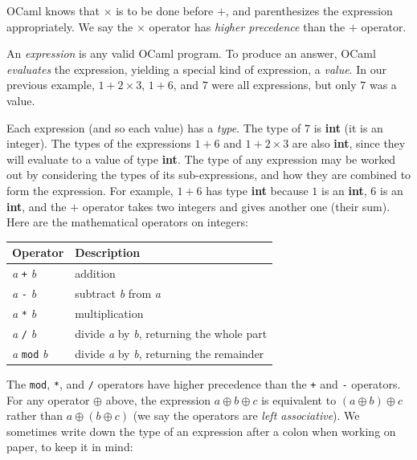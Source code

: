 \documentclass[]{book}
\newcommand{\smspace}{\vspace{4mm}}
\begin{document}
\noindent OCaml knows that $\times$ is to be done before $+$, and parenthesizes the expression appropriately. We say the $\times$ operator has \textit{higher precedence} than the $+$ operator.

An \textit{expression} is any valid OCaml program. To produce an answer, OCaml
\textit{evaluates} the expression, yielding a special kind of expression, a
\textit{value}. In our previous example, $1 + 2 \times 3$, $1 + 6$, and $7$ were all
expressions, but only $7$ was a value.

Each expression (and so each value) has a \textit{type}. The type of $7$ is
\textrm{\textbf{int}} (it is an integer). The types of the expressions $1 + 6$ and $1 + 2 \times 3$ are also
\textrm{\textbf{int}}, since they will evaluate to a value of type \textrm{\textbf{int}}. The type of any expression may be worked out by considering the types of its
 sub-expressions, and how they are combined to form the expression. For example, $1 + 6$ has
type \textrm{\textbf{int}} because $1$ is an \textrm{\textbf{int}}, $6$ is an \textrm{\textbf{int}}, and
the $+$ operator takes two integers and gives another one (their sum). Here are the mathematical operators on integers:

\smspace
\noindent\begin{tabular}{@{}ll@{}} \toprule
Operator & Description\\
\midrule
\index{+@\texttt{+}}\textit{a} \texttt{+} \textit{b} & addition\\
\index{-@\texttt{-}}\textit{a} \texttt{-} \textit{b} & subtract \textit{b} from \textit{a}\\
\index{*@\texttt{*}}\textit{a} \texttt{*} \textit{b} & multiplication\\
\index{/@\texttt{/}}\textit{a} \texttt{/} \textit{b} & divide \textit{a} by \textit{b}, returning the whole part\\
\index{mod@\texttt{mod}}\textit{a} \texttt{mod} \textit{b} & divide \textit{a} by \textit{b}, returning the remainder\\ \bottomrule
\end{tabular}
\smspace

\noindent The \texttt{mod}, \texttt{*}, and \texttt{/} operators have higher precedence than the \texttt{+} and \texttt{-} operators. For any operator $\oplus$ above, the expression $a \oplus b\oplus c$ is equivalent to $(a \oplus b)\oplus c$ rather than $a \oplus (b \oplus c)$  (we say the operators are \textit{left associative}). We sometimes write down the type of an expression after a colon when working on paper, to keep it in mind:
\end{document}
